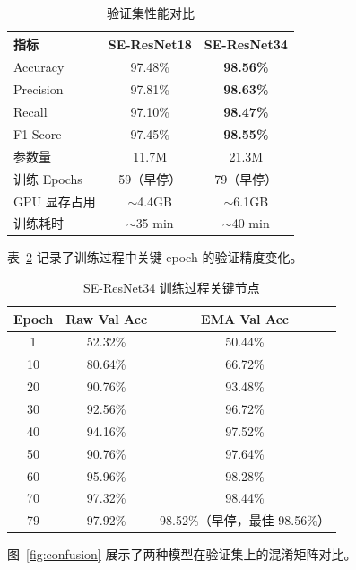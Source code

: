\documentclass[12pt,a4paper]{ctexart}
\begin{document}
\begin{table}[H]
    \centering
    \caption{验证集性能对比}
    \label{tab:results}
    \begin{tabular}{lcc}
        \toprule
        \textbf{指标} & \textbf{SE-ResNet18} & \textbf{SE-ResNet34} \\
        \midrule
        Accuracy  & 97.48\% & \textbf{98.56\%} \\
        Precision & 97.81\% & \textbf{98.63\%} \\
        Recall    & 97.10\% & \textbf{98.47\%} \\
        F1-Score  & 97.45\% & \textbf{98.55\%} \\
        \midrule
        参数量 & 11.7M & 21.3M \\
        训练 Epochs & 59（早停） & 79（早停） \\
        GPU 显存占用 & $\sim$4.4GB & $\sim$6.1GB \\
        训练耗时 & $\sim$35 min & $\sim$40 min \\
        \bottomrule
    \end{tabular}
\end{table}

表~\ref{tab:training_log} 记录了训练过程中关键 epoch 的验证精度变化。

\begin{table}[H]
    \centering
    \caption{SE-ResNet34 训练过程关键节点}
    \label{tab:training_log}
    \begin{tabular}{ccc}
        \toprule
        \textbf{Epoch} & \textbf{Raw Val Acc} & \textbf{EMA Val Acc} \\
        \midrule
        1  & 52.32\% & 50.44\% \\
        10 & 80.64\% & 66.72\% \\
        20 & 90.76\% & 93.48\% \\
        30 & 92.56\% & 96.72\% \\
        40 & 94.16\% & 97.52\% \\
        50 & 90.76\% & 97.64\% \\
        60 & 95.96\% & 98.28\% \\
        70 & 97.32\% & 98.44\% \\
        79 & 97.92\% & 98.52\%（早停，最佳 98.56\%） \\
        \bottomrule
    \end{tabular}
\end{table}

图~\ref{fig:confusion} 展示了两种模型在验证集上的混淆矩阵对比。
\end{document}
